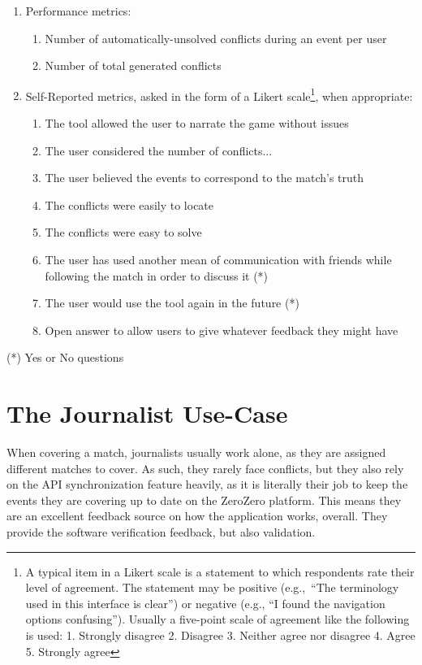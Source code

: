 \begin{enumerate}
    \item Performance metrics:
    \begin{enumerate}
        \item Number of automatically-unsolved conflicts during an event per user
        \item Number of total generated conflicts
    \end{enumerate}
    \item Self-Reported metrics, asked in the form of a Likert scale\footnote{A typical item in a Likert scale is a statement to which respondents rate
    their level of agreement. The statement may be positive (e.g.,\ “The terminology used in this interface is clear”) or negative (e.g., “I found the navigation options confusing”). Usually a five-point scale of agreement like the following is used: 1. Strongly disagree 2. Disagree 3. Neither agree nor disagree 4. Agree 5. Strongly agree}, when appropriate:
    \begin{enumerate}
        \item The tool allowed the user to narrate the game without issues
        \item The user considered the number of conflicts...
        \item The user believed the events to correspond to the match's truth 
        \item The conflicts were easily to locate
        \item The conflicts were easy to solve \\
        \item The user has used another mean of communication with friends while following the match in order to discuss it (*) 
        \item The user would use the tool again in the future (*) \\
        \item Open answer to allow users to give whatever feedback they might have
    \end{enumerate}
\end{enumerate}

(*) Yes or No questions

\section{The Journalist Use-Case}
When covering a match, journalists usually work alone, as they are assigned different matches to cover. As such, they rarely face conflicts, but they also rely on the API synchronization feature heavily, as it is literally their job to keep the events they are covering up to date on the ZeroZero platform. This means they are an excellent feedback source on how the application works, overall. They provide the software verification feedback, but also validation.

